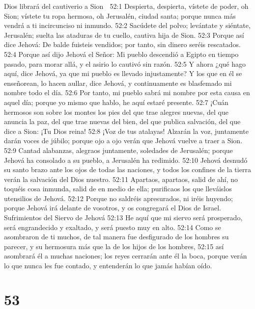 Dios librará del cautiverio a Sion  

52:1 Despierta, despierta, vístete de poder, oh Sion; vístete tu ropa hermosa, oh Jerusalén, ciudad santa; porque nunca más vendrá a ti incircunciso ni inmundo.  
52:2 Sacúdete del polvo; levántate y siéntate, Jerusalén; suelta las ataduras de tu cuello, cautiva hija de Sion.  
52:3 Porque así dice Jehová: De balde fuisteis vendidos; por tanto, sin dinero seréis rescatados.  
52:4 Porque así dijo Jehová el Señor: Mi pueblo descendió a Egipto en tiempo pasado, para morar allá, y el asirio lo cautivó sin razón.  
52:5 Y ahora ¿qué hago aquí, dice Jehová, ya que mi pueblo es llevado injustamente? Y los que en él se enseñorean, lo hacen aullar, dice Jehová, y continuamente es blasfemado mi nombre todo el día.  
52:6 Por tanto, mi pueblo sabrá mi nombre por esta causa en aquel día; porque yo mismo que hablo, he aquí estaré presente.  
52:7 ¡Cuán hermosos son sobre los montes los pies del que trae alegres nuevas, del que anuncia la paz, del que trae nuevas del bien, del que publica salvación, del que dice a Sion: ¡Tu Dios reina!  
52:8 ¡Voz de tus atalayas! Alzarán la voz, juntamente darán voces de júbilo; porque ojo a ojo verán que Jehová vuelve a traer a Sion.  
52:9 Cantad alabanzas, alegraos juntamente, soledades de Jerusalén; porque Jehová ha consolado a su pueblo, a Jerusalén ha redimido.  
52:10 Jehová desnudó su santo brazo ante los ojos de todas las naciones, y todos los confines de la tierra verán la salvación del Dios nuestro.  
52:11 Apartaos, apartaos, salid de ahí, no toquéis cosa inmunda, salid de en medio de ella; purificaos los que lleváislos utensilios de Jehová.  
52:12 Porque no saldréis apresurados, ni iréis huyendo; porque Jehová irá delante de vosotros, y os congregará el Dios de Israel.  
Sufrimientos del Siervo de Jehová  
52:13 He aquí que mi siervo será prosperado, será engrandecido y exaltado, y será puesto muy en alto.  
52:14 Como se asombraron de ti muchos, de tal manera fue desfigurado de los hombres su parecer, y su hermosura más que la de los hijos de los hombres,  
52:15 así asombrará él a muchas naciones; los reyes cerrarán ante él la boca, porque verán lo que nunca les fue contado, y entenderán lo que jamás habían oído. 

\chapter{53}

